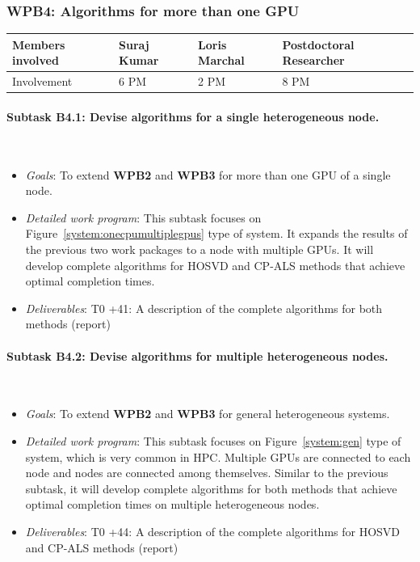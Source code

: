 \documentclass[a4paper,11pt]{article}
\newcommand{\subtask}[1]{{\color{orange}\paragraph{#1}$ $}}
\newcommand{\goal}{{\color{orange2}  \emph{Goals}:} }
\newcommand{\dwp}{{\color{orange2}  \emph{Detailed work program}: }}
\newcommand{\deliverables}{{\color{orange2}  \emph{Deliverables}: }}
\begin{document}
	\subsubsection{\textbf{WPB4}: Algorithms for more than one GPU}
	\vspace*{-0.35cm}\begin{table}[H]
		\begin{tabular}{llll}
			\hline
			\cellcolor{blue2}
			Members involved & Suraj Kumar& Loris Marchal & Postdoctoral Researcher \\
			\hline
			\cellcolor{orange2}
			Involvement      & 6 PM            & 2 PM & 8 PM \\
			\hline
		\end{tabular}
	\end{table}\vspace*{-0.05cm}
	\subtask{Subtask B4.1: Devise algorithms for a single heterogeneous node.}
	\begin{itemize}[leftmargin=-1pt]
		\item[] \goal To extend \textbf{WPB2} and \textbf{WPB3} for more than one GPU of a single node.
		\item[] \dwp This subtask focuses on Figure~\ref{system:onecpumultiplegpus} type of system. It expands the results of the previous two work packages to a node with multiple GPUs. It will develop complete algorithms for HOSVD and CP-ALS methods that achieve optimal completion times.
		\item[] \deliverables
		T0 +41: A description of the complete algorithms for both methods (report)
	\end{itemize}
	\subtask{Subtask B4.2: Devise algorithms for multiple heterogeneous nodes.}
	\begin{itemize}[leftmargin=-1pt]
		\item[] \goal To extend \textbf{WPB2} and \textbf{WPB3} for general heterogeneous systems.
		\item[] \dwp This subtask focuses on Figure~\ref{system:gen} type of system, which is very common in HPC. Multiple GPUs are connected to each node and nodes are connected among themselves. Similar to the previous subtask, it will develop complete algorithms for both methods that achieve optimal completion times on multiple heterogeneous nodes.
		\item[] \deliverables T0 +44: A description of the complete algorithms for HOSVD and CP-ALS methods (report) 
	\end{itemize}
	
\end{document}
